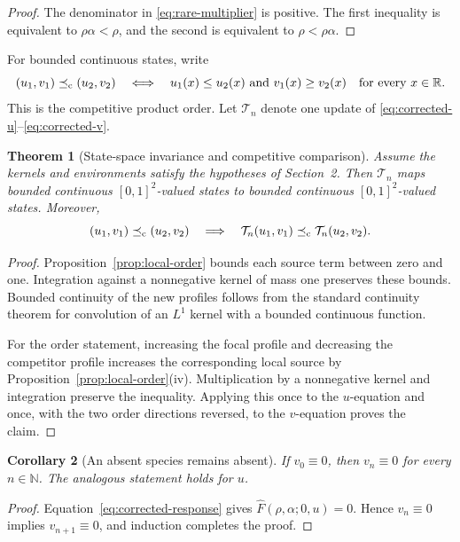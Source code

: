 \documentclass[11pt]{article}
\newtheorem{theorem}{Theorem}[section]
\newtheorem{corollary}[theorem]{Corollary}
\theoremstyle{definition}
\newcommand{\R}{\mathbb R}
\newcommand{\N}{\mathbb N}
\newcommand{\Fhat}{\widehat F}
\newcommand{\T}{\mathcal T}
\begin{document}
\begin{proof}
The denominator in \eqref{eq:rare-multiplier} is positive.  The first
inequality is equivalent to
\(\rho\alpha<\rho\), and the second is equivalent to
\(\rho<\rho\alpha\).
\end{proof}

For bounded continuous states, write
\[
  (u_1,v_1)\preceq_{\rm c}(u_2,v_2)
  \quad\Longleftrightarrow\quad
  u_1(x)\leq u_2(x)
  \ \text{and}\
  v_1(x)\geq v_2(x)
  \quad\text{for every }x\in\R.
\]
This is the competitive product order.  Let \(\T_n\) denote one update of
\eqref{eq:corrected-u}--\eqref{eq:corrected-v}.

\begin{theorem}[State-space invariance and competitive comparison]
\label{thm:state-space}
Assume the kernels and environments satisfy the hypotheses of Section~2.
Then \(\T_n\) maps bounded continuous
\([0,1]^2\)-valued states to bounded continuous
\([0,1]^2\)-valued states.  Moreover,
\[
  (u_1,v_1)\preceq_{\rm c}(u_2,v_2)
  \quad\Longrightarrow\quad
  \T_n(u_1,v_1)\preceq_{\rm c}\T_n(u_2,v_2).
\]
\end{theorem}

\begin{proof}
Proposition~\ref{prop:local-order} bounds each source term between zero and
one.  Integration against a nonnegative kernel of mass one preserves these
bounds.  Bounded continuity of the new profiles follows from the standard
continuity theorem for convolution of an \(L^1\) kernel with a bounded
continuous function.

For the order statement, increasing the focal profile and decreasing the
competitor profile increases the corresponding local source by
Proposition~\ref{prop:local-order}(iv).  Multiplication by a nonnegative
kernel and integration preserve the inequality.  Applying this once to the
\(u\)-equation and once, with the two order directions reversed, to the
\(v\)-equation proves the claim.
\end{proof}

\begin{corollary}[An absent species remains absent]
\label{cor:zero-species}
If \(v_0\equiv0\), then \(v_n\equiv0\) for every \(n\in\N\).  The analogous
statement holds for \(u\).
\end{corollary}

\begin{proof}
Equation~\eqref{eq:corrected-response} gives
\(\Fhat(\rho,\alpha;0,u)=0\).  Hence \(v_n\equiv0\) implies
\(v_{n+1}\equiv0\), and induction completes the proof.
\end{proof}
\end{document}
